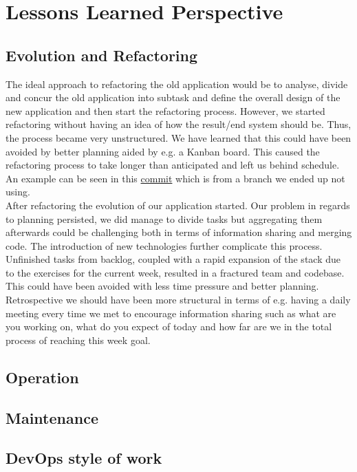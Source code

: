\section{Lessons Learned Perspective}

\subsection{Evolution and Refactoring}
The ideal approach to refactoring the old application would be to analyse, divide and concur the old application into 
subtask and define the overall design of the new application and then start the refactoring process. However, we started
refactoring without having an idea of how the result/end system should be. Thus, the process became very unstructured. 
We have learned that this could have been avoided by better planning aided by e.g. a Kanban board. This caused the 
refactoring process to take longer than anticipated and left us behind schedule. An example can be seen in this
\href{https://github.com/organizationGB/DevOps/commit/7bbccc97d6d69e90724b00e93e92334210490085}{commit} which is from a 
branch we ended up not using. \\

After refactoring the evolution of our application started. Our problem in regards to planning persisted, we did manage
to divide tasks but aggregating them afterwards could be challenging both in terms of information sharing and merging 
code. The introduction of new technologies further complicate this process. Unfinished tasks from backlog, coupled
with a rapid expansion of the stack due to the exercises for the current week, resulted in a fractured team and
codebase. This could have been avoided with less time pressure and better planning.\\

Retrospective we should have been more structural in terms of e.g. having a daily meeting every time we met to encourage 
information sharing such as what are you working on, what do you expect of today and how far are we in the total process
of reaching this week goal.

\subsection{Operation}


\subsection{Maintenance}

\subsection{DevOps style of work}